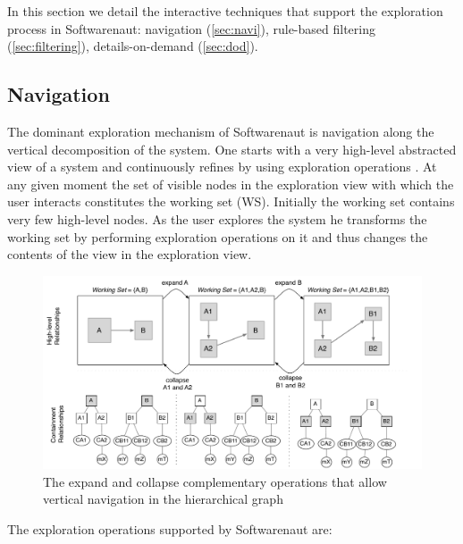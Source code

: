 \documentclass[preprint,12pt]{elsarticle}
\begin{document}
In this section we detail the interactive techniques that support the exploration process in Softwarenaut: navigation (\ref{sec:navi}), 
rule-based filtering (\ref{sec:filtering}),
details-on-demand (\ref{sec:dod}). 

\subsection{Navigation} 

The dominant exploration mechanism of Softwarenaut is navigation along the vertical decomposition of the system. One starts with a very high-level abstracted view of a system and continuously refines by using exploration operations \cite{robertson-conetrees}. At any given moment the set of visible nodes in the exploration view with which the user interacts constitutes the working set (WS). Initially the working set contains very few high-level nodes. As the user explores the system he transforms the working set by performing exploration operations on it and thus changes the contents of the view in the exploration view.

\begin{figure}[ht]
\begin{center}
\includegraphics[width=\linewidth]{SnautSequence}
\caption{The expand and collapse complementary operations that allow vertical navigation in the hierarchical graph}
\label{}
\end{center}
\end{figure}

The exploration operations supported by Softwarenaut are:
\end{document}
